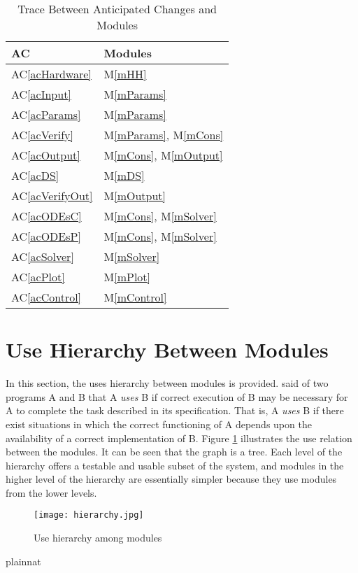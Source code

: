 \documentclass[12pt, titlepage]{article}
\newcommand{\acref}[1]{AC\ref{#1}}
\newcommand{\mref}[1]{M\ref{#1}}
\begin{document}
\begin{table}[H]
\centering
\begin{tabular}{p{} p{}}
\toprule
\textbf{AC} & \textbf{Modules}\\
\midrule
\acref{acHardware} & \mref{mHH}\\
\acref{acInput} & \mref{mParams}\\
\acref{acParams} &\mref{mParams}\\
\acref{acVerify} & \mref{mParams}, \mref{mCons}\\
\acref{acOutput} & \mref{mCons}, \mref{mOutput}\\
\acref{acDS} & \mref{mDS}\\
\acref{acVerifyOut} & \mref{mOutput}\\
\acref{acODEsC} & \mref{mCons}, \mref{mSolver}\\
\acref{acODEsP} &  \mref{mCons}, \mref{mSolver}\\
\acref{acSolver} & \mref{mSolver}\\
\acref{acPlot} & \mref{mPlot}\\
\acref{acControl} & \mref{mControl}\\
\bottomrule
\end{tabular}
\caption{Trace Between Anticipated Changes and Modules}
\label{TblACT}
\end{table}

\section{Use Hierarchy Between Modules} \label{SecUse}


In this section, the uses hierarchy between modules is provided. \cite{Parnas1978} said of two programs A and B that A {\em uses} B if correct execution of B may be necessary for A to complete the task described in its specification. That is, A {\em uses} B if there exist situations in which
the correct functioning of A depends upon the availability of a correct implementation of B.  Figure \ref{FigUH} illustrates the use relation between the modules. It can be seen that the graph is a tree. Each level of the hierarchy offers a testable and usable subset of the system, and modules in the higher level of the hierarchy are essentially simpler because they use modules from the lower levels.



\begin{figure}[H]
\centering
\texttt{[image: hierarchy.jpg]}
\caption{Use hierarchy among modules}
\label{FigUH}
\end{figure}


 {plainnat}


\newpage{}
\end{document}
